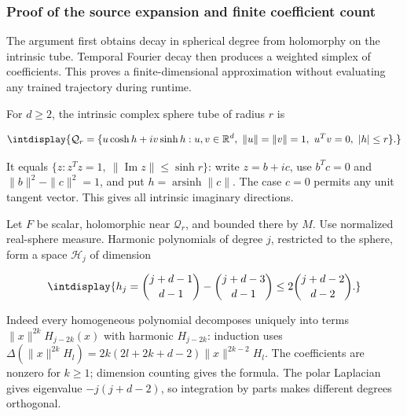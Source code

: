 \subsubsection{Proof of the source expansion and finite coefficient count}
\label{int:compact-harmonic-proof}
\label{int:harmonic-expansion-proof}


The argument first obtains decay in spherical degree from holomorphy on the intrinsic tube. Temporal Fourier decay then produces a weighted simplex of coefficients. This proves a finite-dimensional approximation without evaluating any trained trajectory during runtime.



For \(d\ge2\), the intrinsic complex sphere tube of radius \(r\) is


\begingroup\renewcommand{\theHequation}{intdisplay.551}
\begin{equation*}
\intdisplay{
\mathcal Q_r=\{u\cosh h+i v\sinh h:
       u,v\in\mathbb R^d,\ \|u\|=\|v\|=1,\ u^Tv=0,\ |h|\le r\}.
}
\end{equation*}
\endgroup


It equals \(\{z:z^Tz=1,\allowbreak \ \|\operatorname{Im}z\|\le\sinh r\}\): write \(z=b+ic\), use \(b^Tc=0\) and \(\|b\|^2-\|c\|^2=1\), and put \(h=\operatorname{arsinh}\|c\|\). The case \(c=0\) permits any unit tangent vector. This gives all intrinsic imaginary directions.



Let \(F\) be scalar, holomorphic near \(\mathcal Q_r\), and bounded there by \(M\). Use normalized real-sphere measure. Harmonic polynomials of degree \(j\), restricted to the sphere, form a space \(\mathcal H_j\) of dimension


\begingroup\renewcommand{\theHequation}{intdisplay.552}
\begin{equation*}
\intdisplay{
h_j=\binom{j+d-1}{d-1}-\binom{j+d-3}{d-1}
                  \le2\binom{j+d-2}{d-2}.
}
\end{equation*}
\endgroup


Indeed every homogeneous polynomial decomposes uniquely into terms \(\|x\|^{2k}H_{j-2k}(x)\) with harmonic \(H_{j-2k}\): induction uses \(\Delta(\|x\|^{2k}H_l)=2k(2l+2k+d-2)\|x\|^{2k-2}H_l\). The coefficients are nonzero for \(k\ge1\); dimension counting gives the formula. The polar Laplacian gives eigenvalue \(-j(j+d-2)\), so integration by parts makes different degrees orthogonal.


